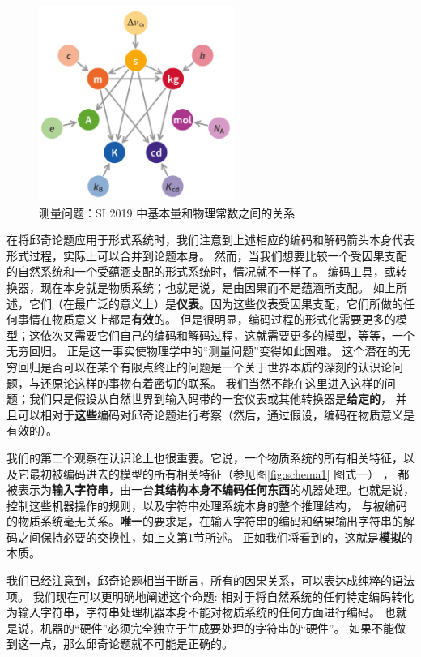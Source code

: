 \documentclass[a4paper,12pt]{article}
\begin{document}
\begin{figure}[ht]
\centering
\includegraphics[height=2.5in]{images/unit_relations_SI.png}
\caption{测量问题：SI 2019 中基本量和物理常数之间的关系}
\end{figure}

在将邱奇论题应用于形式系统时，我们注意到上述相应的编码和解码箭头本身代表形式过程，实际上可以合并到论题本身。
然而，当我们想要比较一个受因果支配的自然系统和一个受蕴涵支配的形式系统时，情况就不一样了。
编码工具，或转换器，现在本身就是物质系统；也就是说，是由因果而不是蕴涵所支配。
如上所述，它们（在最广泛的意义上）是\textbf{仪表}。因为这些仪表受因果支配，它们所做的任何事情在物质意义上都是\textbf{有效}的。
但是很明显，编码过程的形式化需要更多的模型；这依次又需要它们自己的编码和解码过程，这就需要更多的模型，等等，一个无穷回归。
正是这一事实使物理学中的“\gls{测量问题}”变得如此困难。
这个潜在的无穷回归是否可以在某个有限点终止的问题是一个关于世界本质的深刻的认识论问题，与还原论这样的事物有着密切的联系。
我们当然不能在这里进入这样的问题；我们只是假设从自然世界到输入码带的一套仪表或其他转换器是\textbf{给定的}，
并且可以相对于\textbf{这些}编码对邱奇论题进行考察（然后，通过假设，编码在物质意义是有效的）。

我们的第二个观察在认识论上也很重要。它说，一个物质系统的所有相关特征，以及它最初被编码进去的模型的所有相关特征（参见图\ref{fig:schema1} 图式一） ，
都被表示为\textbf{输入字符串}，由一台\textbf{其结构本身不编码任何东西}的机器处理。也就是说，控制这些机器操作的规则，以及字符串处理系统本身的整个推理结构，
与被编码的物质系统毫无关系。\textbf{唯一}的要求是，在输入字符串的编码和结果输出字符串的解码之间保持必要的交换性，如上文第1节所述。
正如我们将看到的，这就是\textbf{\gls{模拟}}的本质。

我们已经注意到，邱奇论题相当于断言，所有的因果关系，可以表达成纯粹的语法项。
我们现在可以更明确地阐述这个命题: 相对于将自然系统的任何特定编码转化为输入字符串，字符串处理机器本身不能对物质系统的任何方面进行编码。
也就是说，机器的“硬件”必须完全独立于生成要处理的字符串的“硬件”。 如果不能做到这一点，那么邱奇论题就不可能是正确的。
\end{document}

